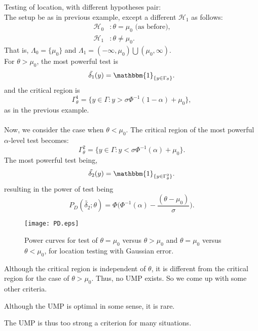\documentclass[a4paper,english,12pt]{article}
\begin{document}
\begin{exmp}{Testing of location, with different hypotheses pair:}\\
The setup be as in previous example, except a different $\mathcal{H}_1$ as follows:
\begin{align*}
\mathcal{H}_0 &: \theta = \mu_0  \text{   (as before),}\\
\mathcal{H}_1 &: \theta \neq \mu_0.
\end{align*}
That is, $\Lambda_0 = \{\mu_0\}$ and $\Lambda_1 = (-\infty, \mu_0) \bigcup (\mu_0, \infty)$.\\
For $\theta > \mu_0$, the most powerful test is
\begin{equation}
\tilde{\delta_1}(y) = \mathbbm{1}_{\{y \in \Gamma_\theta\}}.
\end{equation}
and the critical region is
\begin{equation}
\Gamma_\theta^1 = \{y \in \Gamma: y > \sigma\Phi^{-1}(1 - \alpha) + \mu_0\},
\end{equation}
as in the previous example.\\\\
Now, we consider the case when $\theta < \mu_0$. The critical region of the most powerful $\alpha$-level test becomes:
\begin{equation}
\Gamma_\theta^2 = \{y \in \Gamma: y < \sigma\Phi^{-1}(\alpha) + \mu_0\}.
\end{equation}
The most powerful test being,
\begin{equation}
\tilde{\delta_2}(y) = \mathbbm{1}_{\{y \in \Gamma_\theta^2\}}.
\end{equation}
resulting in the power of test being
\begin{equation}
P_D(\tilde{\delta_2}; \theta) = \Phi\Big(\Phi^{-1}(\alpha) - \dfrac{(\theta - \mu_0)}{\sigma}\Big).
\end{equation}
\begin{figure}
\centering
\texttt{[image: PD.eps]}
\caption{Power curves for test of $\theta = \mu_0$ versus $\theta > \mu_0$ and $\theta = \mu_0$ versus $\theta < \mu_0$, for location testing with Gaussian error.}
\label{fig: example 1.5 and 1.6}
\end{figure}
\end{exmp}
\begin{rem}
Although the critical region is independent of $\theta$, it is different from the critical region for the case of $\theta > \mu_0$. Thus, no UMP exists. So we come up with some other criteria.
\end{rem}
\begin{rem}
Although the UMP is optimal in some sense, it is rare.
\end{rem}
\begin{rem}
The UMP is thus too strong a criterion for many situations.
\end{rem}
\end{document}
